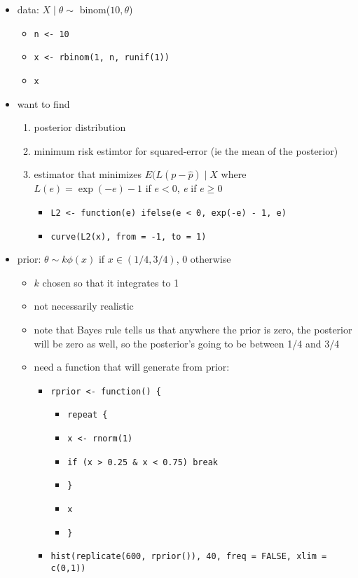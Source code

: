 \begin{itemize}
\item data: $X \mid \theta \sim$ binom($10, \theta$)
\begin{itemize}
\item \texttt{n <- 10}
\item \texttt{x <- rbinom(1, n, runif(1))}
\item \texttt{x}
\end{itemize}
\item want to find
\begin{enumerate}
\item posterior distribution
\item minimum risk estimtor for squared-error (ie the mean of the posterior)
\item estimator that minimizes $E(L(p - \hat p) \mid X$ where
          $L(e) = \exp(-e) - 1$ if $e < 0$, \emph{e} if $e \geq 0$
\begin{itemize}
\item \texttt{L2 <- function(e) ifelse(e < 0, exp(-e) - 1, e)}
\item \texttt{curve(L2(x), from = -1, to = 1)}
\end{itemize}
\end{enumerate}
\item prior: $\theta \sim k \phi(x)$ if $x \in (1/4, 3/4)$, 0 otherwise
\begin{itemize}
\item $k$ chosen so that it integrates to 1
\item not necessarily realistic
\item note that Bayes rule tells us that anywhere the prior is zero,
         the posterior will be zero as well, so the posterior's going to be 
         between 1/4 and 3/4
\item need a function that will generate from prior:
\begin{itemize}
\item \texttt{rprior <- function() \{}
\begin{itemize}
\item \texttt{repeat \{}
\item \texttt{x <- rnorm(1)}
\item \texttt{if (x > 0.25 \& x < 0.75) break}
\item \texttt{\}}
\item \texttt{x}
\item \texttt{\}}
\end{itemize}
\item \texttt{hist(replicate(600, rprior()), 40, freq = FALSE, xlim = c(0,1))}

\end{itemize}
\end{itemize}
\end{itemize}
